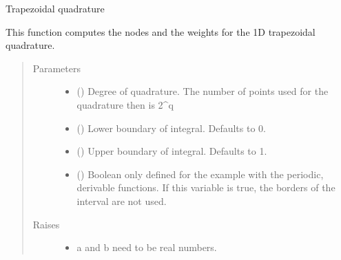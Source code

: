 \documentclass[letterpaper,10pt,english]{sphinxmanual}
\begin{document}
\begin{fulllineitems}
\label{\detokenize{index:Studienprojekt_Smolyak_qmc_one_point.one_dim_trapezoidal}}
Trapezoidal quadrature

This function computes the nodes and the weights for the 1D trapezoidal quadrature.
\begin{quote}\begin{description}
\item[{Parameters}] \leavevmode\begin{itemize}
\item {} 
 () \textendash{} Degree of quadrature. The number of points used for the quadrature then is 2\textasciicircum{}q

\item {} 
 (\sphinxstyleliteralemphasis{\sphinxupquote{, }}) \textendash{} Lower boundary of integral. Defaults to 0.

\item {} 
 (\sphinxstyleliteralemphasis{\sphinxupquote{, }}) \textendash{} Upper boundary of integral. Defaults to 1.

\item {} 
 (\sphinxstyleliteralemphasis{\sphinxupquote{, }}) \textendash{} Boolean only defined for the example with the periodic, derivable functions.
If this variable is true, the borders of the interval are not used.

\end{itemize}

\item[{Raises}] \leavevmode\begin{itemize}
\item {} 
 \textendash{} a and b need to be real numbers.


\end{itemize}
\end{description}
\end{quote}
\end{fulllineitems}
\end{document}

